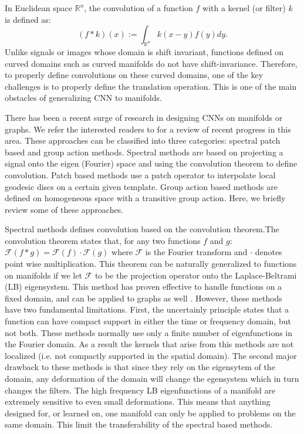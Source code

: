 \documentclass[10pt,twocolumn,letterpaper]{article}
\def\F{\mathcal{F}}
\def\RR{\mathbb{R}}
\begin{document}
In Euclidean space $\RR^n$, the convolution of a function $f$ with a kernel (or filter) $k$ is defined as:
\begin{equation}
(f * k)(x) := \int_{\RR^n} k(x-y)f(y) dy.
\end{equation}
Unlike signals or images whose domain is shift invariant, functions defined on curved domains such as curved manifolds do not have shift-invariance. Therefore, to properly define convolutions on these curved domains, one of the key challenges is to properly define the translation operation. This is one of the main obstacles of generalizing CNN to manifolds.


There has been a recent surge of research in designing CNNs on manifolds or graphs. We refer the interested readers to \cite{bronstein2017geometric} for a review of recent progress in this area. These approaches can be classified into three categories: spectral patch based and group action methods. Spectral methods are based on projecting a signal onto the eigen (Fourier) space and using the convolution theorem to define convolution. Patch based methods use a patch operator to interpolate local geodesic discs on a certain given template. Group action based methods are defined on homogeneous space with a transitive group action.   Here, we briefly review some of these approaches.

Spectral methods defines convolution based on the convolution theorem.The convolution theorem states that, for any two functions $f$ and $g$: $\F (f * g) = \F(f)\cdot \F(g)$
where $\F$ is the Fourier transform and $\cdot$ denotes point wise multiplication. This theorem can be naturally generalized to functions on manifolds if we let $\F$ to be the projection operator onto the Laplace-Beltrami (LB) eigensystem. This method has proven effective to handle functions on a fixed domain, and can be applied to graphs as well \cite{hammond2011wavelets,bruna2013spectral,dong2015sparse,henaff2015deep}. However, these methods have two fundamental limitations. First, the uncertainly principle states that a function can have compact support in either the time or frequency domain, but not both. These methods normally use only a finite number of eigenfunctions in the Fourier domain. As a result the kernels that arise from this methods are not localized (i.e. not compactly supported in the spatial domain). The second major drawback to these methods is that since they rely on the eigensytem of the domain, any deformation of the domain will change the egensystem which in turn changes the filters. The high frequency LB eigenfunctions of a manifold are extremely sensitive to even small deformations. This means that anything designed for, or learned on, one manifold can only be applied to problems on the same domain. This limit the transferability of the spectral based methods.
\end{document}

